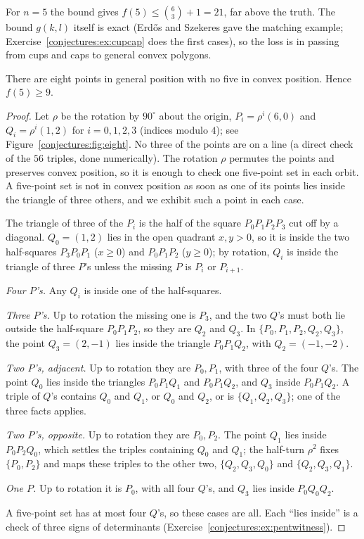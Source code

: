 For $n=5$ the bound gives $f(5)\le\binom63+1=21$, far above the truth. The bound $g(k,l)$ itself is exact (Erd\H os and Szekeres gave the matching
example; Exercise~\ref{conjectures:ex:cupcap} does the first cases), so the loss is in passing from cups and caps to general convex polygons.

\begin{proposition}\label{conjectures:prop:eight}
There are eight points in general position with no five in convex position. Hence $f(5)\ge9$.
\end{proposition}
\begin{proof}
Let $\rho$ be the rotation by $90^\circ$ about the origin, $P_i=\rho^i(6,0)$ and $Q_i=\rho^i(1,2)$ for $i=0,1,2,3$ (indices modulo $4$); see
Figure~\ref{conjectures:fig:eight}. No three of the points are on a line (a direct check of the $56$ triples, done numerically). The rotation $\rho$ permutes
the points and preserves convex position, so it is enough to check one five-point set in each orbit. A five-point set is not in convex position as
soon as one of its points lies inside the triangle of three others, and we exhibit such a point in each case.

The triangle of three of the $P_i$ is the half of the square $P_0P_1P_2P_3$ cut off by a diagonal. $Q_0=(1,2)$ lies in the open quadrant $x,y>0$, so it is
inside the two half-squares $P_3P_0P_1$ ($x\ge0$) and $P_0P_1P_2$ ($y\ge0$); by rotation, $Q_i$ is inside the triangle of three $P$'s unless the
missing $P$ is $P_i$ or $P_{i+1}$.

\emph{Four $P$'s.} Any $Q_i$ is inside one of the half-squares.

\emph{Three $P$'s.} Up to rotation the missing one is $P_3$, and the two $Q$'s must both lie outside the half-square $P_0P_1P_2$, so they are $Q_2$ and
$Q_3$. In $\{P_0,P_1,P_2,Q_2,Q_3\}$, the point $Q_3=(2,-1)$ lies inside the triangle $P_0P_1Q_2$, with $Q_2=(-1,-2)$.

\emph{Two $P$'s, adjacent.} Up to rotation they are $P_0,P_1$, with three of the four $Q$'s. The point $Q_0$ lies inside the triangles $P_0P_1Q_1$ and
$P_0P_1Q_2$, and $Q_3$ inside $P_0P_1Q_2$. A triple of $Q$'s contains $Q_0$ and $Q_1$, or $Q_0$ and $Q_2$, or is $\{Q_1,Q_2,Q_3\}$; one of the three facts
applies.

\emph{Two $P$'s, opposite.} Up to rotation they are $P_0,P_2$. The point $Q_1$ lies inside $P_0P_2Q_0$, which settles the triples containing $Q_0$ and $Q_1$;
the half-turn $\rho^2$ fixes $\{P_0,P_2\}$ and maps these triples to the other two, $\{Q_2,Q_3,Q_0\}$ and $\{Q_2,Q_3,Q_1\}$.

\emph{One $P$.} Up to rotation it is $P_0$, with all four $Q$'s, and $Q_3$ lies inside $P_0Q_0Q_2$.

A five-point set has at most four $Q$'s, so these cases are all. Each ``lies inside'' is a check of three signs of determinants
(Exercise~\ref{conjectures:ex:pentwitness}).
\end{proof}

